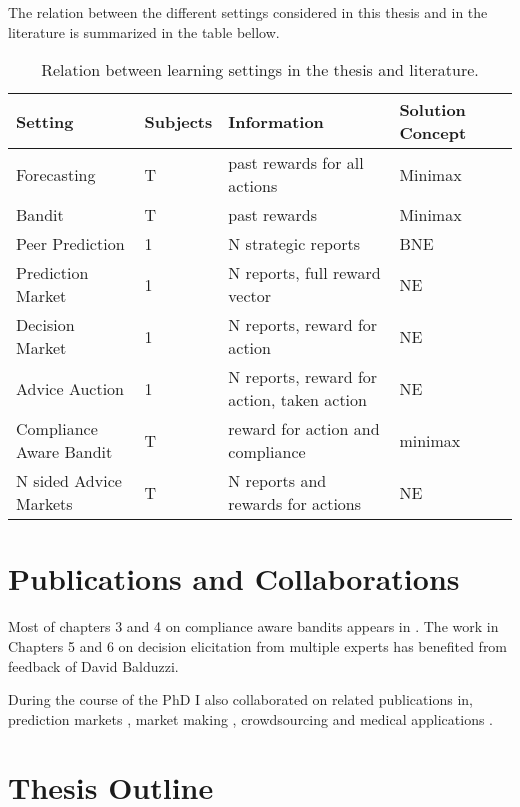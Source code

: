 The relation between the different settings considered in this thesis and in the literature is summarized in the table bellow.

\begin{table}
	\begin{tabular}{lllll}
		\toprule
		Setting & Subjects & Information & Solution Concept\\
		\midrule
		Forecasting & T  & past rewards for all actions & Minimax  \\
		Bandit & T  & past rewards &  Minimax  \\
		Peer Prediction & 1 & N strategic reports & BNE \\
		Prediction Market & 1 & N reports, full reward vector &  NE\\
		Decision Market & 1 & N reports, reward for action & NE  \\
		Advice Auction  & 1 & N reports, reward for action, taken action & NE  \\
		Compliance Aware Bandit & T  & reward for action and compliance & minimax \\
		N sided Advice Markets  & T  &  N  reports and rewards for actions & NE  \\
		\bottomrule
	\end{tabular}
	\caption{Relation between learning settings in the thesis and literature.}
\end{table}


\section{Publications and Collaborations}

Most of chapters 3 and 4 on compliance aware bandits appears in \citep{della2016compliance}. The work in Chapters 5 and 6 on decision elicitation from multiple experts has benefited from feedback of David Balduzzi.

During the course of the PhD I also collaborated on related publications in, prediction markets \citep{frongillo2012interpreting}, market making \citep{kinathil2014closed,kinathil2016symbolic}, crowdsourcing \citep{della2012crowd} and medical applications \citep{della2016out}.


\section{Thesis Outline}
\label{sec:outline}


